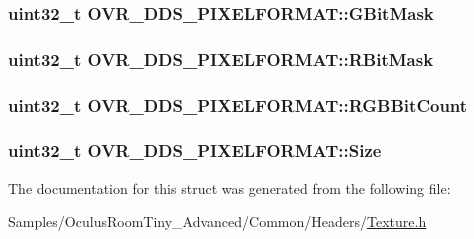 \subsubsection[{\texorpdfstring{G\+Bit\+Mask}{GBitMask}}]{\setlength{\rightskip}{0pt plus 5cm}uint32\+\_\+t O\+V\+R\+\_\+\+D\+D\+S\+\_\+\+P\+I\+X\+E\+L\+F\+O\+R\+M\+A\+T\+::\+G\+Bit\+Mask}\hypertarget{struct_o_v_r___d_d_s___p_i_x_e_l_f_o_r_m_a_t_a91d43b30eaf50f2eb51ccf500f490793}{}\label{struct_o_v_r___d_d_s___p_i_x_e_l_f_o_r_m_a_t_a91d43b30eaf50f2eb51ccf500f490793}
\subsubsection[{\texorpdfstring{R\+Bit\+Mask}{RBitMask}}]{\setlength{\rightskip}{0pt plus 5cm}uint32\+\_\+t O\+V\+R\+\_\+\+D\+D\+S\+\_\+\+P\+I\+X\+E\+L\+F\+O\+R\+M\+A\+T\+::\+R\+Bit\+Mask}\hypertarget{struct_o_v_r___d_d_s___p_i_x_e_l_f_o_r_m_a_t_a3bcaa8b8745f43597deef9248408a96e}{}\label{struct_o_v_r___d_d_s___p_i_x_e_l_f_o_r_m_a_t_a3bcaa8b8745f43597deef9248408a96e}
\subsubsection[{\texorpdfstring{R\+G\+B\+Bit\+Count}{RGBBitCount}}]{\setlength{\rightskip}{0pt plus 5cm}uint32\+\_\+t O\+V\+R\+\_\+\+D\+D\+S\+\_\+\+P\+I\+X\+E\+L\+F\+O\+R\+M\+A\+T\+::\+R\+G\+B\+Bit\+Count}\hypertarget{struct_o_v_r___d_d_s___p_i_x_e_l_f_o_r_m_a_t_a3986b797ae77fd2a274744bf93d6626a}{}\label{struct_o_v_r___d_d_s___p_i_x_e_l_f_o_r_m_a_t_a3986b797ae77fd2a274744bf93d6626a}
\subsubsection[{\texorpdfstring{Size}{Size}}]{\setlength{\rightskip}{0pt plus 5cm}uint32\+\_\+t O\+V\+R\+\_\+\+D\+D\+S\+\_\+\+P\+I\+X\+E\+L\+F\+O\+R\+M\+A\+T\+::\+Size}\hypertarget{struct_o_v_r___d_d_s___p_i_x_e_l_f_o_r_m_a_t_a36e9f53f78969fa1f1fc7c3424e9564a}{}\label{struct_o_v_r___d_d_s___p_i_x_e_l_f_o_r_m_a_t_a36e9f53f78969fa1f1fc7c3424e9564a}


The documentation for this struct was generated from the following file\+:\begin{DoxyCompactItemize}
\item 
Samples/\+Oculus\+Room\+Tiny\+\_\+\+Advanced/\+Common/\+Headers/\hyperlink{_texture_8h}{Texture.\+h}\end{DoxyCompactItemize}
